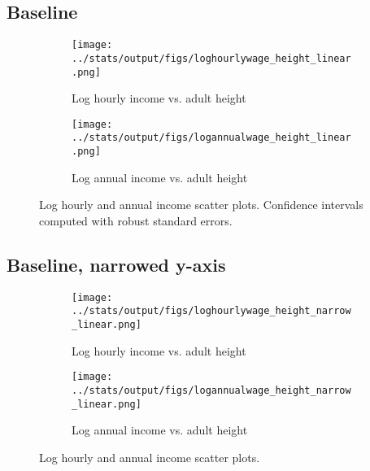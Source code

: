 \subsection{Baseline}
\begin{figure}[htbp]
	\begin{subfigure}[b]{0.9\textwidth}
		\centering
		\texttt{[image: ../stats/output/figs/loghourlywage\_height\_linear.png]}	
		\label{fig:loghourlywageheight}
		\caption{Log hourly income vs. adult height}
	\end{subfigure}
	
	\begin{subfigure}[b]{0.9\textwidth}
		\centering
		\texttt{[image: ../stats/output/figs/logannualwage\_height\_linear.png]}	
		\label{fig:logannualwageheight}
		\caption{Log annual income vs. adult height}
	\end{subfigure}
	\caption{Log hourly and annual income scatter plots. Confidence intervals computed with robust standard errors.}
\end{figure}


\clearpage
\subsection{Baseline, narrowed y-axis}
\begin{figure}[htbp]
	\begin{subfigure}[b]{0.9\textwidth}
		\centering
		\texttt{[image: ../stats/output/figs/loghourlywage\_height\_narrow\_linear.png]}	
		\label{fig:loghourlywageheight}
		\caption{Log hourly income vs. adult height}
	\end{subfigure}
	
	\begin{subfigure}[b]{0.9\textwidth}
		\centering
		\texttt{[image: ../stats/output/figs/logannualwage\_height\_narrow\_linear.png]}	
		\label{fig:logannualwageheight}
		\caption{Log annual income vs. adult height}
	\end{subfigure}
	\caption{Log hourly and annual income scatter plots.}
\end{figure}


\clearpage
